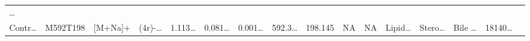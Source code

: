 \documentclass[
]{article}
\begin{document}
\begin{longtable}[]{@{}llllllllllllllll@{}}
\begin{minipage}[t]{0.02\columnwidth}
\ldots{}\strut
\end{minipage}\tabularnewline
\begin{minipage}[t]{0.04\columnwidth}\raggedright
Contr\ldots{}\strut
\end{minipage} & \begin{minipage}[t]{0.04\columnwidth}\raggedright
M592T198\strut
\end{minipage} & \begin{minipage}[t]{0.04\columnwidth}\raggedright
{[}M+Na{]}+\strut
\end{minipage} & \begin{minipage}[t]{0.04\columnwidth}\raggedright
(4r)-\ldots{}\strut
\end{minipage} & \begin{minipage}[t]{0.04\columnwidth}\raggedright
1.113\ldots{}\strut
\end{minipage} & \begin{minipage}[t]{0.04\columnwidth}\raggedright
0.081\ldots{}\strut
\end{minipage} & \begin{minipage}[t]{0.04\columnwidth}\raggedright
0.001\ldots{}\strut
\end{minipage} & \begin{minipage}[t]{0.04\columnwidth}\raggedright
592.3\ldots{}\strut
\end{minipage} & \begin{minipage}[t]{0.04\columnwidth}\raggedright
198.145\strut
\end{minipage} & \begin{minipage}[t]{0.04\columnwidth}\raggedright
NA\strut
\end{minipage} & \begin{minipage}[t]{0.03\columnwidth}\raggedright
NA\strut
\end{minipage} & \begin{minipage}[t]{0.04\columnwidth}\raggedright
Lipid\ldots{}\strut
\end{minipage} & \begin{minipage}[t]{0.04\columnwidth}\raggedright
Stero\ldots{}\strut
\end{minipage} & \begin{minipage}[t]{0.04\columnwidth}\raggedright
Bile \ldots{}\strut
\end{minipage} & \begin{minipage}[t]{0.04\columnwidth}\raggedright
18140\ldots{}\strut
\end{minipage} & \begin{minipage}[t]{0.02\columnwidth}\raggedright

\end{minipage}
\end{longtable}
\end{document}
